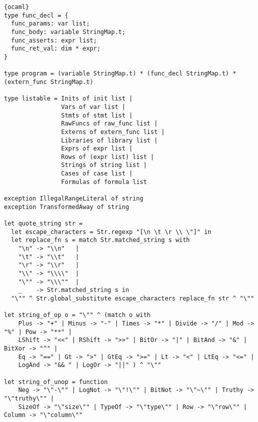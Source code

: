 \begin{lstlisting}{ocaml}
type func_decl = {
  func_params: var list;
  func_body: variable StringMap.t;
  func_asserts: expr list;
  func_ret_val: dim * expr;
}

type program = (variable StringMap.t) * (func_decl StringMap.t) * (extern_func StringMap.t)

type listable = Inits of init list |
                Vars of var list |
                Stmts of stmt list |
                RawFuncs of raw_func list |
                Externs of extern_func list |
                Libraries of library list |
                Exprs of expr list |
                Rows of (expr list) list |
                Strings of string list |
                Cases of case list |
                Formulas of formula list

exception IllegalRangeLiteral of string
exception TransformedAway of string

let quote_string str =
  let escape_characters = Str.regexp "[\n \t \r \\ \"]" in
  let replace_fn s = match Str.matched_string s with
    "\n" -> "\\n"   |
    "\t" -> "\\t"   |
    "\r" -> "\\r"   |
    "\\" -> "\\\\"  |
    "\"" -> "\\\""  |
    _    -> Str.matched_string s in
  "\"" ^ Str.global_substitute escape_characters replace_fn str ^ "\""

let string_of_op o = "\"" ^ (match o with
    Plus -> "+" | Minus -> "-" | Times -> "*" | Divide -> "/" | Mod -> "%" | Pow -> "**" |
    LShift -> "<<" | RShift -> ">>" | BitOr -> "|" | BitAnd -> "&" | BitXor -> "^" |
    Eq -> "==" | Gt -> ">" | GtEq -> ">=" | Lt -> "<" | LtEq -> "<=" |
    LogAnd -> "&& " | LogOr -> "||" ) ^ "\""

let string_of_unop = function
    Neg -> "\"-\"" | LogNot -> "\"!\"" | BitNot -> "\"~\"" | Truthy -> "\"truthy\"" |
    SizeOf -> "\"size\"" | TypeOf -> "\"type\"" | Row -> "\"row\"" | Column -> "\"column\""


\end{lstlisting}
